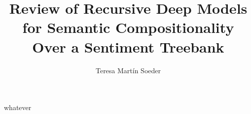 \documentclass[11pt,a4paper]{article}
\title{Review of Recursive Deep Models for Semantic Compositionality Over a Sentiment Treebank \citep{socher2013recursive}}
\date{}
\author{Teresa Martín Soeder}
\begin{document}
\maketitle

whatever

\nocite{*}


\end{document}
